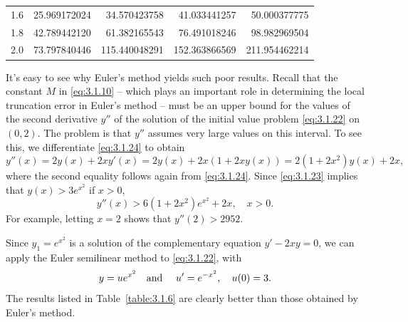 \begin{examplesolution}
\begin{newtable}
\begin{center}
\begin{tabular}{|c|r|r|r|r|}
      1.6                       & 25.969172024                  & 34.570423758                  & 41.033441257                   & 50.000377775                    \\
      1.8                       & 42.789442120                  & 61.382165543                  & 76.491018246                   & 98.982969504                    \\
      2.0                       & 73.797840446                  & 115.440048291                 & 152.363866569                  & 211.954462214                   \\
      \hline
    \end{tabular}
  \end{center}
\end{newtable}

It's easy to see why Euler's method yields such poor results. Recall that the constant $M$ in
\eqref{eq:3.1.10} -- which plays an important role in determining the local truncation error in
Euler's method -- must be an upper bound for the values of the second derivative $y''$ of the
solution of the initial value problem \eqref{eq:3.1.22} on $(0,2)$. The problem is that $y''$
assumes very large values on this interval. To see this, we differentiate \eqref{eq:3.1.24} to
obtain
\[
  y''(x)=2y(x)+2xy'(x)=2y(x)+2x(1+2xy(x))=2(1+2x^{2})y(x)+2x,
\]
where the second equality follows again from \eqref{eq:3.1.24}. Since \eqref{eq:3.1.23} implies that
$y(x)>3e^{x^{2}}$ if $x>0$,
\[
  y''(x)>6(1+2x^{2})e^{x^{2}}+2x,\quad x>0.
\]
For example, letting $x=2$ shows that $y''(2)>2952$.

 Since $y_{1}=e^{x^{2}}$ is a solution of the complementary equation $y'-2xy=0$, we
can apply the Euler semilinear method to \eqref{eq:3.1.22}, with
\[
  y=ue^{x^{2}}\mbox{\quad and \quad}u'=e^{-x^{2}},\quad u(0)=3.
\]
The results listed in Table~\ref{table:3.1.6} are clearly better than those obtained by Euler's
method.


\end{examplesolution}

